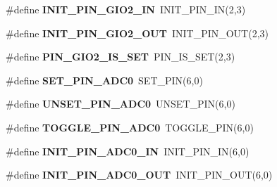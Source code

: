 \begin{DoxyCompactItemize}
\item 
\hypertarget{group__chaos__internal_gad156fdd1b2dfc8dd611851f20a473e9b}{\#define {\bfseries I\-N\-I\-T\-\_\-\-P\-I\-N\-\_\-\-G\-I\-O2\-\_\-\-I\-N}~I\-N\-I\-T\-\_\-\-P\-I\-N\-\_\-\-I\-N(2,3)}\label{group__chaos__internal_gad156fdd1b2dfc8dd611851f20a473e9b}

\item 
\hypertarget{group__chaos__internal_gaf3dc5da27a868271c23e74eb154eccc9}{\#define {\bfseries I\-N\-I\-T\-\_\-\-P\-I\-N\-\_\-\-G\-I\-O2\-\_\-\-O\-U\-T}~I\-N\-I\-T\-\_\-\-P\-I\-N\-\_\-\-O\-U\-T(2,3)}\label{group__chaos__internal_gaf3dc5da27a868271c23e74eb154eccc9}

\item 
\hypertarget{group__chaos__internal_ga65467f55f5f794db7c8e5632da8ac657}{\#define {\bfseries P\-I\-N\-\_\-\-G\-I\-O2\-\_\-\-I\-S\-\_\-\-S\-E\-T}~P\-I\-N\-\_\-\-I\-S\-\_\-\-S\-E\-T(2,3)}\label{group__chaos__internal_ga65467f55f5f794db7c8e5632da8ac657}

\item 
\hypertarget{group__chaos__internal_gaf651b41e6c086eac871b0c3e42c8bdfa}{\#define {\bfseries S\-E\-T\-\_\-\-P\-I\-N\-\_\-\-A\-D\-C0}~S\-E\-T\-\_\-\-P\-I\-N(6,0)}\label{group__chaos__internal_gaf651b41e6c086eac871b0c3e42c8bdfa}

\item 
\hypertarget{group__chaos__internal_ga00c8bcab557d9f470960221a0faf7704}{\#define {\bfseries U\-N\-S\-E\-T\-\_\-\-P\-I\-N\-\_\-\-A\-D\-C0}~U\-N\-S\-E\-T\-\_\-\-P\-I\-N(6,0)}\label{group__chaos__internal_ga00c8bcab557d9f470960221a0faf7704}

\item 
\hypertarget{group__chaos__internal_gadaaddfb6856dfeee2660bad8fbcdcc63}{\#define {\bfseries T\-O\-G\-G\-L\-E\-\_\-\-P\-I\-N\-\_\-\-A\-D\-C0}~T\-O\-G\-G\-L\-E\-\_\-\-P\-I\-N(6,0)}\label{group__chaos__internal_gadaaddfb6856dfeee2660bad8fbcdcc63}

\item 
\hypertarget{group__chaos__internal_ga96ba5b963a4f3f42502b9c7b791684f2}{\#define {\bfseries I\-N\-I\-T\-\_\-\-P\-I\-N\-\_\-\-A\-D\-C0\-\_\-\-I\-N}~I\-N\-I\-T\-\_\-\-P\-I\-N\-\_\-\-I\-N(6,0)}\label{group__chaos__internal_ga96ba5b963a4f3f42502b9c7b791684f2}

\item 
\hypertarget{group__chaos__internal_gaf88d6905492ec51bf4b6764bcf2b09a5}{\#define {\bfseries I\-N\-I\-T\-\_\-\-P\-I\-N\-\_\-\-A\-D\-C0\-\_\-\-O\-U\-T}~I\-N\-I\-T\-\_\-\-P\-I\-N\-\_\-\-O\-U\-T(6,0)}\label{group__chaos__internal_gaf88d6905492ec51bf4b6764bcf2b09a5}


\end{DoxyCompactItemize}
